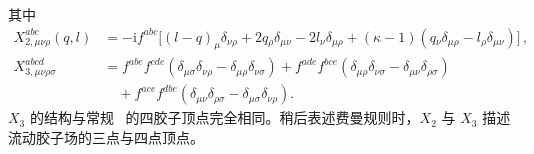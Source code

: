 其中
\begin{equation}
  \begin{split}
  X_{2,\mu \nu \rho}^{abc}(q,l) &= -\mathrm{i} f^{a b c} \big[
  (l-q)_\mu \delta_{\nu \rho} + 2q{}_{\rho} \delta_{\mu \nu}- 2l{}_{\nu}
  \delta_{\mu \rho} + (\kappa - 1) ( q{}_{\nu} \delta_{\mu
    \rho} -l{}_{\rho} \delta_{\mu \nu}) \big]\,,\\
  X_{3,\mu \nu \rho \sigma}^{abcd} &= f^{abe}
  f^{cde}(\delta_{\mu \sigma} \delta_{\nu \rho} - \delta_{\mu \rho}
  \delta_{\nu \sigma}) + f^{ade} f^{bce}(\delta_{\mu \rho}
  \delta_{\nu \sigma}- \delta_{\mu \nu} \delta_{\rho \sigma})\\&\quad
  + f^{ace} f^{dbe}(\delta_{\mu \nu} \delta_{\rho \sigma}-
  \delta_{\mu \sigma} \delta_{\nu \rho}).
  \end{split}
\end{equation}
$X_3$ 的结构与常规 \qcd\ 的四胶子顶点完全相同。稍后表述费曼规则时，$X_2$
与 $X_3$ 描述流动胶子场的三点与四点顶点。

